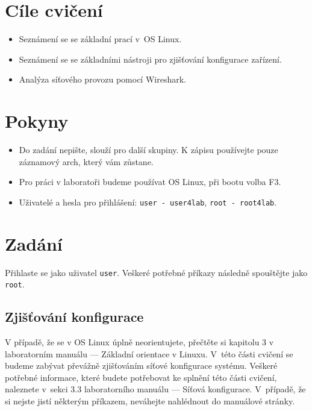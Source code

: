 \section*{Cíle cvičení}
\begin{itemize}
	\item Seznámení se se základní prací v~OS Linux.
	\item Seznámení se se základními nástroji pro zjišťování konfigurace zařízení.
	\item Analýza síťového provozu pomocí Wireshark.
\end{itemize}

\section*{Pokyny}
\begin{itemize}
\item Do zadání nepište, slouží pro další skupiny. K zápisu používejte pouze záznamový arch, který vám zůstane.
\item Pro práci v laboratoři budeme používat OS Linux, při bootu volba F3.
\item Uživatelé a hesla pro přihlášení: \texttt{user - user4lab}, \texttt{root - root4lab}.
\end{itemize}

\section{Zadání}
Přihlaste se jako uživatel \texttt{user}. Veškeré potřebné příkazy následně spouštějte jako \texttt{root}.

\subsection{Zjišťování konfigurace}
V případě, že se v OS Linux úplně neorientujete, přečtěte si kapitolu 3 v
laboratorním manuálu --- Základní orientace v Linuxu. V~této části cvičení se
budeme zabývat převážně zjišťováním síťové konfigurace systému. Veškeré potřebné
informace, které budete potřebovat ke splnění této části cvičení, naleznete
v~sekci 3.3 laboratorního manuálu --- Síťová konfigurace. V~případě, že si nejste jistí některým příkazem, neváhejte nahlédnout do manuálové stránky.

